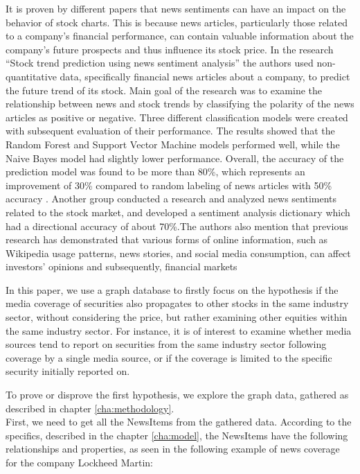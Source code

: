 It is proven by different papers that news sentiments can have an impact on the behavior of stock charts. This is because news articles, particularly those related to a company's financial performance, can contain valuable information about the company's future prospects and thus influence its stock price. In the research “Stock trend prediction using news sentiment analysis” \cite{1607019540:online} the authors used non-quantitative data, specifically financial news articles about a company, to predict the future trend of its stock. Main goal of the research was to examine the relationship between news and stock trends by classifying the polarity of the news articles as positive or negative. Three different classification models were created with subsequent evaluation of their performance. The results showed that the Random Forest and Support Vector Machine models performed well, while the Naive Bayes model had slightly lower performance. Overall, the accuracy of the prediction model was found to be more than 80\%, which represents an improvement of 30\% compared to random labeling of news articles with 50\% accuracy \cite{1607019540:online}. 
Another group conducted a research and analyzed news sentiments related to the stock market, and developed a sentiment analysis dictionary which had a directional accuracy of about 70\%.The authors also mention that previous research has demonstrated that various forms of online information, such as Wikipedia usage patterns, news stories, and social media consumption, can affect investors' opinions and subsequently, financial markets \cite{1812041948:online}

\newpage
In this paper, we use a graph database to firstly focus on the hypothesis if the media coverage of securities also propagates to other stocks in the same industry sector, without considering the price, but rather examining other equities within the same industry sector.  For instance, it is of interest to examine whether media sources tend to report on securities from the same industry sector following coverage by a single media source, or if the coverage is limited to the specific security initially reported on.


\noindent To prove or disprove the first hypothesis, we explore the graph data, gathered as described in chapter \ref{cha:methodology}.\\
First, we need to get all the NewsItems from the gathered data. According to the specifics, described in the chapter \ref{cha:model}, the NewsItems have the following relationships and properties, as seen in the following example of news coverage for the company Lockheed Martin:

